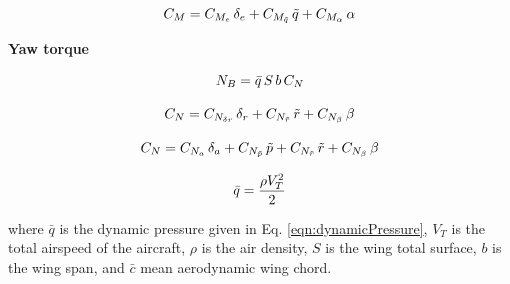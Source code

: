 \begin{equation}{\label{eqn:makoC_M}}
C_M =  C_{M_{e}} \, \delta_{e} + C_{M_{\tilde{q}}} \, \tilde{q} +  C_{M_\alpha} \, \alpha 
\end{equation}

\textbf{Yaw torque}

\begin{equation}{\label{eqn:yawTorque}}
N_B = \bar{q} \, S \, b \, C_N \\
\end{equation}


\begin{equation}{\label{eqn:bigCraftC_N}}
C_N= C_{N_{\delta r}} \, \delta_{r} + C_{N_{\tilde{r}}} \, \tilde{r} +  C_{N_\beta} \, \beta 
\end{equation}

\begin{equation}{\label{eqn:makoC_N}}
C_N= C_{N_{a}} \, \delta_{a} + C_{N_{\tilde{p}}} \, \tilde{p} + C_{N_{\tilde{r}}} \, \tilde{r} +  C_{N_\beta} \, \beta 
\end{equation}

\begin{equation}{\label{eqn:dynamicPressure}}
\bar{q} = \frac{\rho V_T^2}{2} 
\end{equation}

where $\bar{q}$ is the dynamic pressure given in  Eq. \ref{eqn:dynamicPressure}, $V_T$ is the total airspeed of the aircraft, $\rho$ is the air density, $S$ is the wing total surface, $b$ is the wing span, and $\bar{c}$ mean aerodynamic wing chord. 

